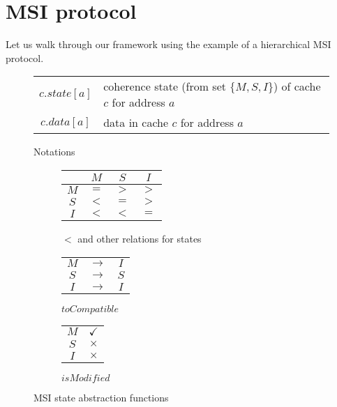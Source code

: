 \section{MSI protocol}
\label{sec:msi}

Let us walk through our framework using the example of a hierarchical MSI
protocol.


\begin{figure}
\begin{tabularx}{\linewidth}{|cX|}
\hline
$c.state[a]$ & coherence state (from set $\{M, S, I\}$) of cache $c$ for address $a$\\
$c.data[a]$ & data in cache $c$ for address $a$\\
\hline
\end{tabularx}
\caption{Notations}
\label{table:lineinfo}
\end{figure}

\begin{figure}
\begin{subfigure}{.43\linewidth}
\centering
\begin{tabular}{|c|ccc|}
\hline
& $M$ & $S$ & $I$\\
\hline
$M$ & $=$ & $>$ & $>$\\
$S$ & $<$ & $=$ & $>$\\
$I$ & $<$ & $<$ & $=$\\
\hline
\end{tabular}
\caption{$<$ and other relations for states}
\label{msi<}
\end{subfigure}
\begin{subfigure}{.31\linewidth}
\centering
\begin{tabular}{|ccc|}
\hline
$M$ & $\rightarrow$ & $I$\\
$S$ & $\rightarrow$ & $S$\\
$I$ & $\rightarrow$ & $I$\\
\hline
\end{tabular}
\caption{$toCompatible$}
\label{toCompat}
\end{subfigure}
\begin{subfigure}{.22\linewidth}
\centering
\begin{tabular}{|c|c|}
\hline
$M$ & $\checkmark$\\
$S$ & $\times$\\
$I$ & $\times$\\
\hline
\end{tabular}
\caption{$isModified$}
\label{isModified}
\end{subfigure}
\caption{MSI state abstraction functions}
\label{funcs}
\end{figure}

